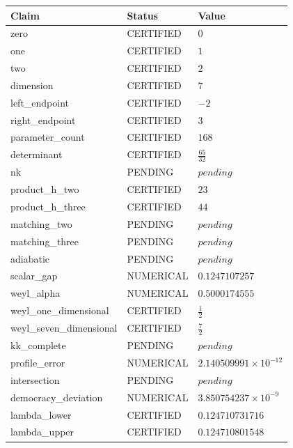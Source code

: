 \begin{tabular}{lll}
Claim & Status & Value \\
\hline
zero & CERTIFIED & $0$ \\
one & CERTIFIED & $1$ \\
two & CERTIFIED & $2$ \\
dimension & CERTIFIED & $7$ \\
left\_endpoint & CERTIFIED & $-2$ \\
right\_endpoint & CERTIFIED & $3$ \\
parameter\_count & CERTIFIED & $168$ \\
determinant & CERTIFIED & $\frac{65}{32}$ \\
nk & PENDING & $pending$ \\
product\_h\_two & CERTIFIED & $23$ \\
product\_h\_three & CERTIFIED & $44$ \\
matching\_two & PENDING & $pending$ \\
matching\_three & PENDING & $pending$ \\
adiabatic & PENDING & $pending$ \\
scalar\_gap & NUMERICAL & $0.1247107257$ \\
weyl\_alpha & NUMERICAL & $0.5000174555$ \\
weyl\_one\_dimensional & CERTIFIED & $\frac{1}{2}$ \\
weyl\_seven\_dimensional & CERTIFIED & $\frac{7}{2}$ \\
kk\_complete & PENDING & $pending$ \\
profile\_error & NUMERICAL & $2.140509991\times 10^{-12}$ \\
intersection & PENDING & $pending$ \\
democracy\_deviation & NUMERICAL & $3.850754237\times 10^{-9}$ \\
lambda\_lower & CERTIFIED & $0.124710731716$ \\
lambda\_upper & CERTIFIED & $0.124710801548$ \\
\end{tabular}
